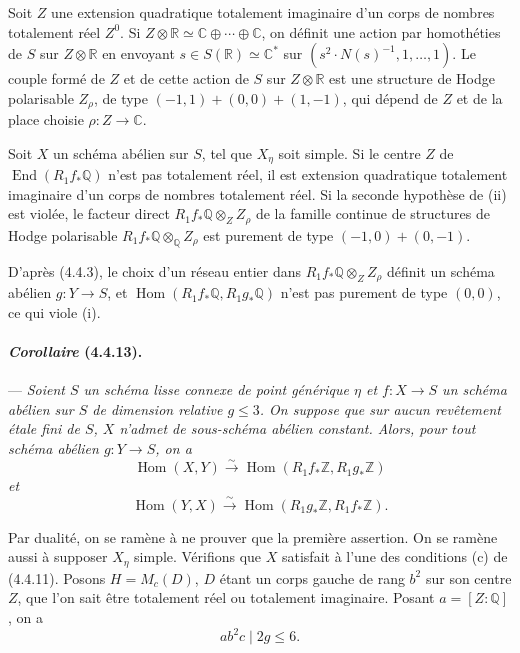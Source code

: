 \documentclass[10pt]{article}
\newcommand{\C}{\mathbb C}
\newcommand{\Q}{\mathbb Q}
\newcommand{\Z}{\mathbb Z}
\newcommand{\Hom}{\operatorname{Hom}}
\newcommand{\iso}{\xrightarrow{\sim}}
\newcommand{\R}{\mathbb R}
\providecommand{\End}{\operatorname{End}}
\begin{document}
Soit $Z$ une extension quadratique totalement imaginaire d'un corps de nombres totalement réel $Z^0$. Si $Z\otimes\R\simeq \C\oplus\cdots\oplus\C$, on définit une action par homothéties de $S$ sur $Z\otimes\R$ en envoyant $s\in S(\R)\simeq\C^*$ sur $(s^2\cdot N(s)^{-1},1,\ldots,1)$. Le couple formé de $Z$ et de cette action de $S$ sur $Z\otimes\R$ est une structure de Hodge polarisable $Z_\rho$, de type $(-1,1)+(0,0)+(1,-1)$, qui dépend de $Z$ et de la place choisie $\rho:Z\to\C$.

Soit $X$ un schéma abélien sur $S$, tel que $X_\eta$ soit simple. Si le centre $Z$ de $\End(R_1f_*\Q)$ n'est pas totalement réel, il est extension quadratique totalement imaginaire d'un corps de nombres totalement réel. Si la seconde hypothèse de (ii) est violée, le facteur direct $R_1f_*\Q\otimes_Z Z_\rho$ de la famille continue de structures de Hodge polarisable $R_1f_*\Q\otimes_\Q Z_\rho$ est purement de type $(-1,0)+(0,-1)$.

D'après (4.4.3), le choix d'un réseau entier dans $R_1f_*\Q\otimes_Z Z_\rho$ définit un schéma abélien $g:Y\to S$, et $\Hom(R_1f_*\Q,R_1g_*\Q)$ n'est pas purement de type $(0,0)$, ce qui viole (i).

\paragraph{\emph{Corollaire} (4.4.13).} --- {\itshape Soient $S$ un schéma lisse connexe de point générique $\eta$ et $f:X\to S$ un schéma abélien sur $S$ de dimension relative $g\le3$. On suppose que sur aucun revêtement étale fini de $S$, $X$ n'admet de sous-schéma abélien constant. Alors, pour tout schéma abélien $g:Y\to S$, on a
\[
\Hom(X,Y)\iso \Hom(R_1f_*\Z,R_1g_*\Z)
\]
et
\[
\Hom(Y,X)\iso \Hom(R_1g_*\Z,R_1f_*\Z).
\]}

Par dualité, on se ramène à ne prouver que la première assertion. On se ramène aussi à supposer $X_\eta$ simple. Vérifions que $X$ satisfait à l'une des conditions (c) de (4.4.11). Posons $H=M_c(D)$, $D$ étant un corps gauche de rang $b^2$ sur son centre $Z$, que l'on sait être totalement réel ou totalement imaginaire. Posant $a=[Z:\Q]$, on a
\[
\tag{4.4.13.1}
ab^2c\mid 2g\le6.
\]

\end{document}
